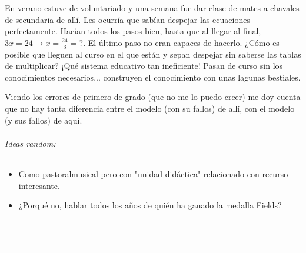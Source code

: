 \documentclass[palatino]{apuntes}
\begin{document}
En verano estuve de voluntariado y una semana fue dar clase de mates a chavales de secundaria de allí. 
%
Les ocurría que sabían despejar las ecuaciones perfectamente. Hacían todos los pasos bien, hasta que al llegar al final, $3x = 24 \to x=\frac{24}{3} = ?$. 
%
El último paso no eran capaces de hacerlo. ¿Cómo es posible que lleguen al curso en el que están y sepan despejar sin saberse las tablas de multiplicar? 
%
¡Qué sistema educativo tan ineficiente! 
%
Pasan de curso sin los conocimientos necesarios... construyen el conocimiento con unas lagunas bestiales.

Viendo los errores de primero de grado (que no me lo puedo creer) me doy cuenta que no hay tanta diferencia entre el modelo (con su fallos) de allí, con el modelo (y sus fallos) de aquí.

\subparagraph{Ideas random:}

\begin{itemize}
	\item Como pastoralmusical pero con "unidad didáctica" relacionado con recurso interesante.
	\item ¿Porqué no, hablar todos los años de quién ha ganado la medalla Fields?
\end{itemize}





\appendix

\chapter{---}


\printindex
\end{document}
